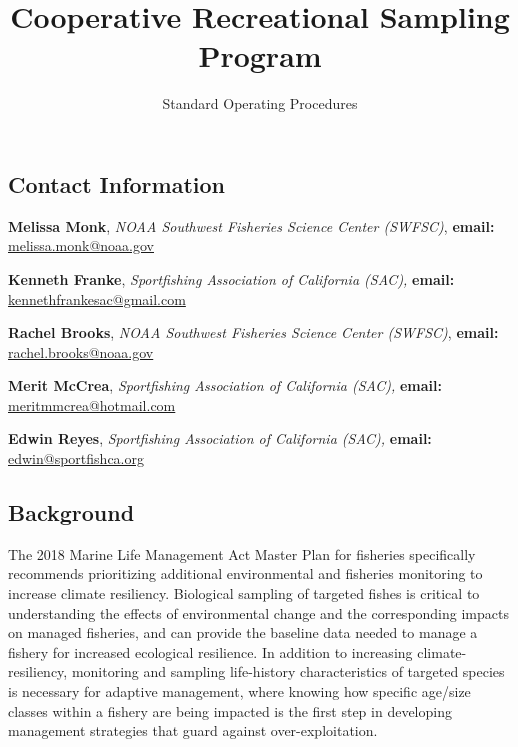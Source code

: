 \documentclass[
  letterpaper,
  DIV=11,
  numbers=noendperiod]{scrartcl}
\title{Cooperative Recreational Sampling Program}
\subtitle{Standard Operating Procedures}
\author{}
\date{}
\begin{document}
\maketitle
\ifdefined\Shaded\renewenvironment{Shaded}{\begin{tcolorbox}[sharp corners, breakable, enhanced, frame hidden, interior hidden, borderline west={3pt}{0pt}{shadecolor}, boxrule=0pt]}{\end{tcolorbox}}\fi

\hypertarget{contact-information}{%
\subsection{Contact Information}\label{contact-information}}

\textbf{Melissa Monk}, \emph{NOAA Southwest Fisheries Science Center
(SWFSC)}, \textbf{email:} \url{melissa.monk@noaa.gov}

\textbf{Kenneth Franke}, \emph{Sportfishing Association of California
(SAC),} \textbf{email:} \url{kennethfrankesac@gmail.com}

\textbf{Rachel Brooks}, \emph{NOAA Southwest Fisheries Science Center
(SWFSC)}, \textbf{email:} \url{rachel.brooks@noaa.gov}

\textbf{Merit McCrea}, \emph{Sportfishing Association of California
(SAC),} \textbf{email:}
\href{edwin@sportfishca.org}{meritmmcrea@hotmail.com}

\textbf{Edwin Reyes}, \emph{Sportfishing Association of California
(SAC),} \textbf{email:} \url{edwin@sportfishca.org}

\hypertarget{background}{%
\subsection{Background}\label{background}}

The 2018 Marine Life Management Act Master Plan for fisheries
specifically recommends prioritizing additional environmental and
fisheries monitoring to increase climate resiliency. Biological sampling
of targeted fishes is critical to understanding the effects of
environmental change and the corresponding impacts on managed fisheries,
and can provide the baseline data needed to manage a fishery for
increased ecological resilience. In addition to increasing
climate-resiliency, monitoring and sampling life-history characteristics
of targeted species is necessary for adaptive management, where knowing
how specific age/size classes within a fishery are being impacted is the
first step in developing management strategies that guard against
over-exploitation.~
\end{document}
